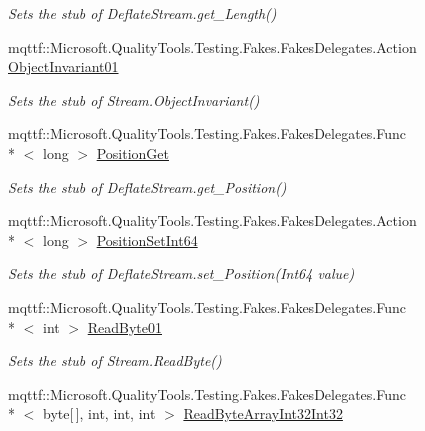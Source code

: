 \begin{DoxyCompactItemize}
\begin{DoxyCompactList}\small\item\em Sets the stub of Deflate\-Stream.\-get\-\_\-\-Length()\end{DoxyCompactList}\item 
mqttf\-::\-Microsoft.\-Quality\-Tools.\-Testing.\-Fakes.\-Fakes\-Delegates.\-Action \hyperlink{class_system_1_1_i_o_1_1_compression_1_1_fakes_1_1_stub_deflate_stream_a5d3af57fb7b24d446ccf965ae604b2d7}{Object\-Invariant01}
\begin{DoxyCompactList}\small\item\em Sets the stub of Stream.\-Object\-Invariant()\end{DoxyCompactList}\item 
mqttf\-::\-Microsoft.\-Quality\-Tools.\-Testing.\-Fakes.\-Fakes\-Delegates.\-Func\\*
$<$ long $>$ \hyperlink{class_system_1_1_i_o_1_1_compression_1_1_fakes_1_1_stub_deflate_stream_aa6d38831b7508cb17c8cf2494a6d6e88}{Position\-Get}
\begin{DoxyCompactList}\small\item\em Sets the stub of Deflate\-Stream.\-get\-\_\-\-Position()\end{DoxyCompactList}\item 
mqttf\-::\-Microsoft.\-Quality\-Tools.\-Testing.\-Fakes.\-Fakes\-Delegates.\-Action\\*
$<$ long $>$ \hyperlink{class_system_1_1_i_o_1_1_compression_1_1_fakes_1_1_stub_deflate_stream_a498ce6a2c5dd4f552aec94b34feddc5a}{Position\-Set\-Int64}
\begin{DoxyCompactList}\small\item\em Sets the stub of Deflate\-Stream.\-set\-\_\-\-Position(\-Int64 value)\end{DoxyCompactList}\item 
mqttf\-::\-Microsoft.\-Quality\-Tools.\-Testing.\-Fakes.\-Fakes\-Delegates.\-Func\\*
$<$ int $>$ \hyperlink{class_system_1_1_i_o_1_1_compression_1_1_fakes_1_1_stub_deflate_stream_ae927177e79419b818b19b6846ecbe928}{Read\-Byte01}
\begin{DoxyCompactList}\small\item\em Sets the stub of Stream.\-Read\-Byte()\end{DoxyCompactList}\item 
mqttf\-::\-Microsoft.\-Quality\-Tools.\-Testing.\-Fakes.\-Fakes\-Delegates.\-Func\\*
$<$ byte\mbox{[}$\,$\mbox{]}, int, int, int $>$ \hyperlink{class_system_1_1_i_o_1_1_compression_1_1_fakes_1_1_stub_deflate_stream_a45b4865b7be05dde8f0d53f758c3cdaa}{Read\-Byte\-Array\-Int32\-Int32}

\end{DoxyCompactItemize}
